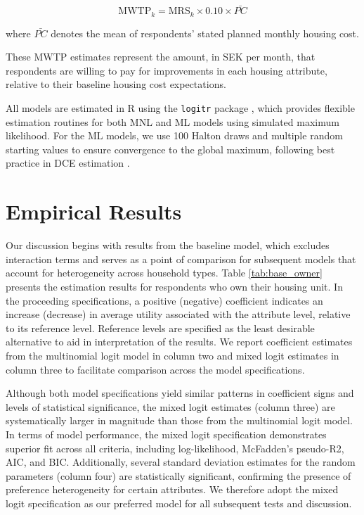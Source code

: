 \documentclass[3p,11pt ]{elsarticle}
\begin{document}
\begin{equation}
\text{MWTP}_k = \text{MRS}_k \times 0.10 \times \bar{PC}
\label{eq:mwtp}
\end{equation}

\noindent where $\bar{PC}$ denotes the mean of respondents' stated planned monthly housing cost.

These MWTP estimates represent the amount, in SEK per month, that respondents are willing to pay for improvements in each housing attribute, relative to their baseline housing cost expectations. 

All models are estimated in R using the \texttt{logitr} package \citep{helvestonLogitrFastEstimation2023}, which provides flexible estimation routines for both MNL and ML models using simulated maximum likelihood.
For the ML models,
we use 100 Halton draws and multiple random starting values to ensure convergence to the global maximum, following best practice in DCE estimation \citep{trainDiscreteChoiceMethods2003}.




\section{Empirical Results}

Our discussion begins with results from the baseline model, which excludes interaction terms and serves as a point of comparison for subsequent models that account for heterogeneity across household types.
Table \ref{tab:base_owner} presents the estimation results for respondents who own their housing unit.
In the proceeding specifications, a positive (negative) coefficient indicates an increase (decrease) in average utility associated with the attribute level, relative to its reference level.
Reference levels are specified as the least desirable alternative to aid in interpretation of the results.
We report coefficient estimates from the multinomial logit model in column two and mixed logit estimates in column three  to facilitate comparison across the model specifications.




Although both model specifications yield similar patterns in coefficient signs and levels of statistical significance,
the mixed logit estimates (column three) are systematically larger in magnitude than those from the multinomial logit model.
In terms of model performance,
the mixed logit specification demonstrates superior fit across all criteria, including log-likelihood, McFadden's pseudo-R2, AIC, and BIC.
Additionally, several standard deviation estimates for the random parameters (column four) are statistically significant, confirming the presence of preference heterogeneity for certain attributes.
We therefore adopt the mixed logit specification as our preferred model for all subsequent tests and discussion.
\end{document}
